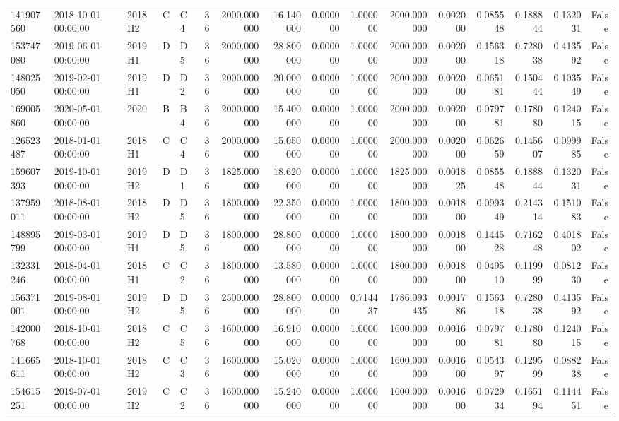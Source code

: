 \begin{tabular}{lllllrrrrrrrrrrr}
141907560 & 2018-10-01 00:00:00 & 2018H2 & C & C4 & 36 & 2000.000000 & 16.140000 & 0.000000 & 1.000000 & 2000.000000 & 0.002000 & 0.085548 & 0.188844 & 0.132031 & False \\
153747080 & 2019-06-01 00:00:00 & 2019H1 & D & D5 & 36 & 2000.000000 & 28.800000 & 0.000000 & 1.000000 & 2000.000000 & 0.002000 & 0.156318 & 0.728038 & 0.413592 & False \\
148025050 & 2019-02-01 00:00:00 & 2019H1 & D & D2 & 36 & 2000.000000 & 20.000000 & 0.000000 & 1.000000 & 2000.000000 & 0.002000 & 0.065181 & 0.150444 & 0.103549 & False \\
169005860 & 2020-05-01 00:00:00 & 2020 & B & B4 & 36 & 2000.000000 & 15.400000 & 0.000000 & 1.000000 & 2000.000000 & 0.002000 & 0.079781 & 0.178080 & 0.124015 & False \\
126523487 & 2018-01-01 00:00:00 & 2018H1 & C & C4 & 36 & 2000.000000 & 15.050000 & 0.000000 & 1.000000 & 2000.000000 & 0.002000 & 0.062659 & 0.145607 & 0.099985 & False \\
159607393 & 2019-10-01 00:00:00 & 2019H2 & D & D1 & 36 & 1825.000000 & 18.620000 & 0.000000 & 1.000000 & 1825.000000 & 0.001825 & 0.085548 & 0.188844 & 0.132031 & False \\
137959011 & 2018-08-01 00:00:00 & 2018H2 & D & D5 & 36 & 1800.000000 & 22.350000 & 0.000000 & 1.000000 & 1800.000000 & 0.001800 & 0.099349 & 0.214314 & 0.151083 & False \\
148895799 & 2019-03-01 00:00:00 & 2019H1 & D & D5 & 36 & 1800.000000 & 28.800000 & 0.000000 & 1.000000 & 1800.000000 & 0.001800 & 0.144528 & 0.716248 & 0.401802 & False \\
132331246 & 2018-04-01 00:00:00 & 2018H1 & C & C2 & 36 & 1800.000000 & 13.580000 & 0.000000 & 1.000000 & 1800.000000 & 0.001800 & 0.049510 & 0.119999 & 0.081230 & False \\
156371001 & 2019-08-01 00:00:00 & 2019H2 & D & D5 & 36 & 2500.000000 & 28.800000 & 0.000000 & 0.714437 & 1786.093435 & 0.001786 & 0.156318 & 0.728038 & 0.413592 & False \\
142000768 & 2018-10-01 00:00:00 & 2018H2 & C & C5 & 36 & 1600.000000 & 16.910000 & 0.000000 & 1.000000 & 1600.000000 & 0.001600 & 0.079781 & 0.178080 & 0.124015 & False \\
141665611 & 2018-10-01 00:00:00 & 2018H2 & C & C3 & 36 & 1600.000000 & 15.020000 & 0.000000 & 1.000000 & 1600.000000 & 0.001600 & 0.054397 & 0.129599 & 0.088238 & False \\
154615251 & 2019-07-01 00:00:00 & 2019H2 & C & C2 & 36 & 1600.000000 & 15.240000 & 0.000000 & 1.000000 & 1600.000000 & 0.001600 & 0.072934 & 0.165194 & 0.114451 & False \\

\end{tabular}
